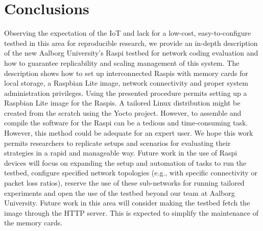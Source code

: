 \documentclass[electronics,article,accept,moreauthors,pdftex,10pt,a4paper]{mdpi}
\theoremstyle{mdpi}
\newcounter{ex}
\newcounter{re}
\theoremstyle{mdpidefinition}
\begin{document}
\section{Conclusions}
%

\label{sec:conclusions}
Observing the expectation of the IoT and lack for a low-cost, easy-to-configure testbed in this area for reproducible research, we provide an in-depth description of the new Aalborg University's Raspi testbed for network coding evaluation and how to guarantee replicability and scaling management of this system. The description shows how to set up interconnected Raspis with memory cards for local storage, a Raspbian Lite image, network connectivity and proper system administration privileges. Using the presented procedure permits setting up a Raspbian Lite image for the Raspis. A tailored Linux distribution might be created from the scratch using the Yocto project. However, to assemble and compile the software for the Raspi can be a tedious and time-consuming task. However, this method could be adequate for an expert user. We hope this work permits researchers to replicate setups and scenarios for evaluating their strategies in a rapid and manageable way. Future work in the use of Raspi devices will focus on expanding the setup and automation of tasks to run the testbed, configure specified network topologies (e.g., with specific connectivity or packet loss ratios), reserve the use of these sub-networks for running tailored experiments and open the use of the testbed beyond our team at Aalborg University. Future work in this area will consider making the testbed fetch the image through the HTTP server. This is expected to simplify the maintenance of the memory cards.



\end{document}
